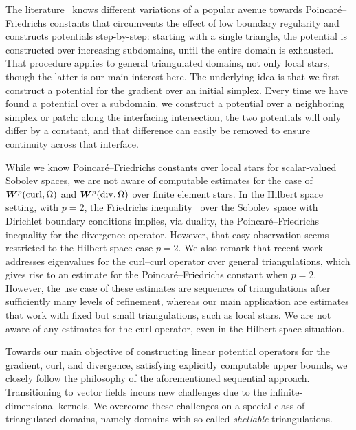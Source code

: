 \documentclass[10pt,a4paper]{article}
\begin{document}
The literature~\cite{Eym_Gal_Her_00,vohralik2005discrete,ern2020stable,ern2021finite,Chaum_Voh_p_rob_3D_H_curl_23,Voh_loc_glob_H1_24} knows different variations of a popular avenue towards Poincar\'e--Friedrichs constants that circumvents the effect of low boundary regularity and constructs potentials step-by-step: 
starting with a single triangle, the potential is constructed over increasing subdomains, until the entire domain is exhausted. 
That procedure applies to general triangulated domains, not only local stars, though the latter is our main interest here. 
The underlying idea is that we first construct a potential for the gradient over an initial simplex. 
Every time we have found a potential over a subdomain, we construct a potential over a neighboring simplex or patch:
along the interfacing intersection, the two potentials will only differ by a constant, 
and that difference can easily be removed to ensure continuity across that interface. 

While we know Poincar\'e--Friedrichs constants over local stars for scalar-valued Sobolev spaces, 
we are not aware of computable estimates for the case of $\bm{W}^{p}(\operatorname{curl},\Omega)$ and $\bm{W}^{p}(\operatorname{div},\Omega)$ over finite element stars. 
In the Hilbert space setting, with $p=2$, the Friedrichs inequality~\cite{burenkov1998sobolev} over the Sobolev space with Dirichlet boundary conditions implies, 
via duality, the Poincar\'e--Friedrichs inequality for the divergence operator. However, that easy observation seems restricted to the Hilbert space case $p=2$. 
We also remark that recent work~\cite{gallistl2023computational} addresses eigenvalues for the curl--curl operator over general triangulations,
which gives rise to an estimate for the Poincar\'e--Friedrichs constant when $p=2$. However, the use case of these estimates are sequences of triangulations after sufficiently many levels of refinement, whereas our main application are estimates that work with fixed but small triangulations, such as local stars. 
We are not aware of any estimates for the curl operator, even in the Hilbert space situation. 

Towards our main objective of constructing linear potential operators for the gradient, curl, and divergence, satisfying explicitly computable upper bounds, we closely follow the philosophy of the aforementioned sequential approach. Transitioning to vector fields incurs new challenges due to the infinite-dimensional kernels. We overcome these challenges on a special class of triangulated domains, namely domains with so-called \emph{shellable} triangulations. 
\\
\end{document}
